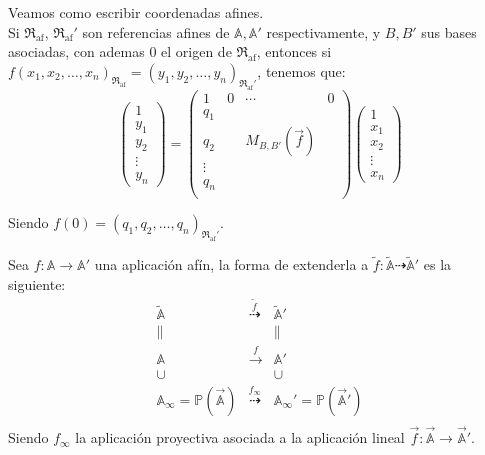 Veamos como escribir coordenadas afines.\\

Si $\mathfrak{R}_{\text{af}}$, $\mathfrak{R}_{\text{af}}'$ son referencias afines de $\mathbb{A}, \mathbb{A}'$ respectivamente, y $B, B'$ sus bases asociadas, con ademas $0$ el origen de $\mathfrak{R}_{\text{af}}$, entonces si $f(x_1, x_2, \ldots, x_n)_{\mathfrak{R}_{\text{af}}} = (y_1, y_2, \ldots, y_n)_{\mathfrak{R}_{\text{af}}'}$, tenemos que:
\[
    \begin{pmatrix}
        1 \\ y_1 \\ y_2 \\ \vdots \\ y_n
    \end{pmatrix} =
    \left(
    \begin{array}{c|ccc}
        1 & 0 & \cdots & 0 \\
        \hline
        q_1 & & & \\
        q_2 & & M_{B, B'}(\vec{f}) & \\
        \vdots & & & \\
        q_n & & & \\
    \end{array}
    \right)
    \begin{pmatrix}
        1 \\ x_1 \\ x_2 \\ \vdots \\ x_n
    \end{pmatrix}
\]

Siendo $f(0) = (q_1, q_2, \ldots, q_n)_{\mathfrak{R}_{\text{af}}'}$.

\begin{definición}
    Sea $f: \mathbb{A} \to \mathbb{A}'$ una aplicación afín, la forma de extenderla a $\widetilde{f}: \widetilde{\mathbb{A}} \dashrightarrow \widetilde{\mathbb{A}}'$ es la siguiente:
    \[
    \begin{array}{ccc}
        \widetilde{\mathbb{A}} & \overset{\widetilde{f}}{\dashrightarrow} & \widetilde{\mathbb{A}}'  \\
        \| & & \| \\
        \mathbb{A} & \overset{f}{\rightarrow} & \mathbb{A}' \\
        \cup & & \cup \\
        \mathbb{A}_{\infty} = \mathbb{P}(\vec{\mathbb{A}}) & \overset{f_{\infty}}{\dashrightarrow} & \mathbb{A}_{\infty}' = \mathbb{P}(\vec{\mathbb{A}}') \\
    \end{array}
    \]
    Siendo $f_{\infty}$ la aplicación proyectiva asociada a la aplicación lineal $\vec{f}: \vec{\mathbb{A}} \to \vec{\mathbb{A}}'$.\\
\end{definición}

